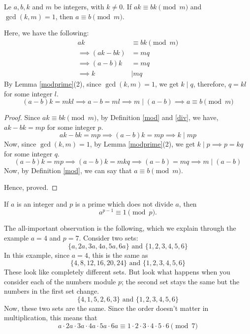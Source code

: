 \begin{proposition} \label{modcancel}
	Le $a, b, k$ and $m$ be integers, with $k \neq 0$. If $ak \equiv bk \pmod m$ and $\gcd(k,m) = 1$, then $a \equiv b \pmod m$.
\end{proposition}

\begin{scratch}
	Here, we have the following:
	\begin{align}
		ak                 & \equiv bk \pmod m \\
		\implies (ak - bk) & = mq              \\
		\implies (a-b)k    & = mq              \\
		\implies k         & \mid mq
	\end{align}
	By Lemma \ref{modprime}(2), since $\gcd(k,m)=1$, we get $k \mid q$, therefore, $q = kl$ for some integer $l$.
	$$(a-b)k = mkl \implies a-b = ml \implies m \mid (a-b) \implies a \equiv b \pmod m$$
\end{scratch}

\begin{proof}
	Since $ak \equiv bk \pmod m$, by Definition \ref{mod} and \ref{div}, we have, $ak - bk = mp$ for some integer $p$.
	$$ak-bk = mp \implies (a-b)k = mp \implies k \mid mp$$
	Now, since $\gcd(k,m) = 1$, by Lemma \ref{modprime}(2), we get $k \mid p \implies p = kq$ for some integer $q$.
	$$(a-b)k = mp \implies (a-b)k = mkq \implies (a-b) = mq \implies m \mid (a-b)$$
	Now, by Definition \ref{mod}, we can say that $a \equiv b \pmod m$.

	Hence, proved.
\end{proof}


\begin{theorem}
	If $a$ is an integer and $p$ is a prime which does not divide $a$, then
	$$a^{p-1} \equiv 1 \pmod p.$$
\end{theorem}

\begin{scratch}
	The all-important observation is the following, which we explain through the example $a = 4$ and $p = 7$. Consider two sets:
	$$\{a, 2a, 3a, 4a, 5a, 6a\} \text{ and } \{1, 2, 3, 4, 5, 6\}$$
	In this example, since $a = 4$, this is the same as
	$$\{4, 8, 12, 16, 20, 24\} \text{ and } \{1, 2, 3, 4, 5, 6\}$$
	These look like completely different sets. But look what happens when you consider each of the numbers module $p$; the second set stays the same but the numbers in the first set change.
	$$\{4, 1, 5, 2, 6, 3\} \text{ and } \{1, 2, 3, 4, 5, 6\}$$
	Now, these two sets are the same. Since the order doesn't matter in multiplication, this means that
	$$a \cdot 2a \cdot 3a \cdot 4a \cdot 5a \cdot 6a \equiv 1 \cdot 2 \cdot 3 \cdot 4 \cdot 5 \cdot 6 \pmod 7$$
\end{scratch}

